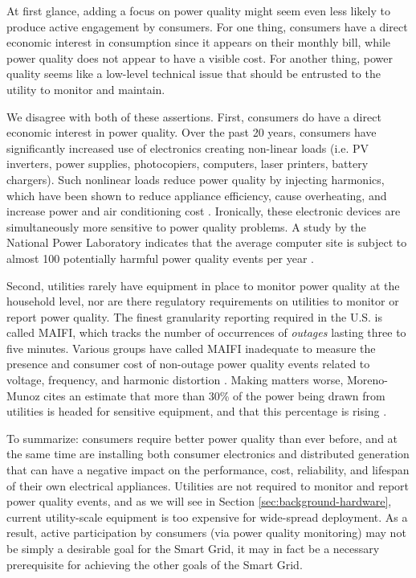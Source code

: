 
At first glance, adding a focus on power quality might seem even less likely to produce active engagement by consumers. For one thing, consumers have a direct economic interest in consumption since it appears on their monthly bill, while power quality does not appear to have a visible cost.  For another thing, power quality seems like a low-level technical issue that should be entrusted to the utility to monitor and maintain. 

We disagree with both of these assertions. First, consumers do have a direct economic interest in power quality. Over the past 20 years, consumers have significantly increased use of electronics creating non-linear loads (i.e. PV inverters, power supplies, photocopiers, computers, laser printers, battery chargers). Such nonlinear loads reduce power quality by injecting harmonics, which have been shown to reduce appliance efficiency, cause overheating, and increase power and air conditioning cost \cite{Rodriguez2010}. Ironically, these electronic devices are simultaneously more sensitive to power quality problems. A study by the National Power Laboratory indicates that the average computer site is subject to almost 100 potentially harmful power quality events per year \cite{Dorr1992}.

Second, utilities rarely have equipment in place to monitor power quality at the household level, nor are there regulatory requirements on utilities to monitor or report power quality. The finest granularity reporting required in the U.S. is called MAIFI, which tracks the number of occurrences of {\em outages} lasting three to five minutes. Various groups have called MAIFI inadequate to measure the presence and consumer cost of non-outage power quality events related to voltage, frequency, and harmonic distortion \cite{Rouse2011,LaCommare2004,Eto2008}. Making matters worse, Moreno-Munoz cites an estimate that more than 30\% of the power being drawn from utilities is headed for sensitive equipment, and that this percentage is rising \cite{Moreno-Munoz2007}. 

To summarize: consumers require better power quality than ever before, and at the same time are installing both consumer electronics and distributed generation that can have a negative impact on the performance, cost, reliability, and lifespan of their own electrical appliances. Utilities are not required to monitor and report power quality events, and as we will see in Section \ref{sec:background-hardware}, current utility-scale equipment is too expensive for wide-spread deployment. As a result, active participation by consumers (via power quality monitoring) may not be simply a desirable goal for the Smart Grid, it may in fact be a necessary prerequisite for achieving the other goals of the Smart Grid. 

